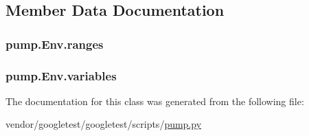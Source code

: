 \subsection{Member Data Documentation}
\subsubsection[{\texorpdfstring{ranges}{ranges}}]{\setlength{\rightskip}{0pt plus 5cm}pump.\+Env.\+ranges}\hypertarget{classpump_1_1Env_a8d5fec087c1a9108de9b105922b34309}{}\label{classpump_1_1Env_a8d5fec087c1a9108de9b105922b34309}
\subsubsection[{\texorpdfstring{variables}{variables}}]{\setlength{\rightskip}{0pt plus 5cm}pump.\+Env.\+variables}\hypertarget{classpump_1_1Env_aba6456f3d0d23ac92bc9508c1b966bcd}{}\label{classpump_1_1Env_aba6456f3d0d23ac92bc9508c1b966bcd}


The documentation for this class was generated from the following file\+:\begin{DoxyCompactItemize}
\item 
vendor/googletest/googletest/scripts/\hyperlink{pump_8py}{pump.\+py}\end{DoxyCompactItemize}
